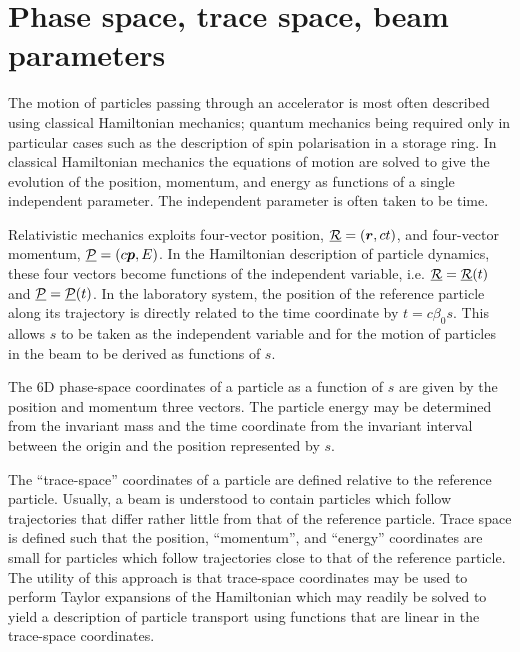 \graphicspath{ {03-PhaseTraceSpace/Figures/} }

\section{Phase space, trace space, beam parameters}

The motion of particles passing through an accelerator is most often
described using classical Hamiltonian mechanics; quantum mechanics
being required only in particular cases such as the description of
spin polarisation in a storage ring.
In classical Hamiltonian mechanics the equations of motion are solved
to give the evolution of the position, momentum, and energy as
functions of a single independent parameter.
The independent parameter is often taken to be time.

Relativistic mechanics exploits four-vector position,
$\underline{\cal{R}} = (\bm{r}, ct)$, and four-vector momentum,
$\underline{\cal{P}} = (c\bm{p}, E)$.
In the Hamiltonian description of particle dynamics, these four
vectors become functions of the independent variable, i.e.
$\underline{\cal{R}} = \underline{\cal{R}}(t)$ and
$\underline{\cal{P}} = \underline{\cal{P}}(t)$.
In the laboratory system, the position of the reference particle along
its trajectory is directly related to the time coordinate by
$t = c \beta_0 s$.
This allows $s$ to be taken as the independent variable and for the
motion of particles in the beam to be derived as functions of $s$.

The 6D phase-space coordinates of a particle as a function of $s$ are
given by the position and momentum three vectors.
The particle energy may be determined from the invariant mass and the
time coordinate from the invariant interval between the origin and the
position represented by $s$.

The ``trace-space'' coordinates of a particle are defined relative to
the reference particle.
Usually, a beam is understood to contain particles which follow
trajectories that differ rather little from that of the reference
particle.
Trace space is defined such that the position, ``momentum'', and
``energy'' coordinates are small for particles which follow
trajectories close to that of the reference particle.
The utility of this approach is that trace-space coordinates may be
used to perform Taylor expansions of the Hamiltonian which may readily
be solved to yield a description of particle transport using functions
that are linear in the trace-space coordinates.

